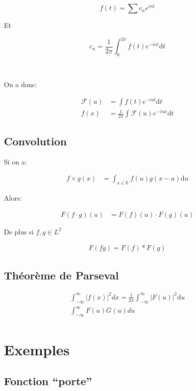 \documentclass[a4paper,11pt]{article}
\begin{document}
$$ f(t) = \sum c_n e^{int}$$

Et

$$ c_n = \frac{1}{2 \pi} \int^{2x}_0 f(t) e ^{-int} \mathrm{d} t $$

\

On a donc:

\begin{align*}
\mathcal{F}(u) &= \int f(t) e^{-iut} \mathrm{d} t \\
  f(x) &= \frac{1}{2 \pi} \int \mathcal{F}(u) e^{-iux} \mathrm{d} t
\end{align*}
\subsection{Convolution}

Si on a:

\begin{align*}
  f \times g(x) &= \int_{x \in \mathbb{R}} f(u) g(x - a) \mathrm{d}u
\end{align*}

Alors:

\begin{align*}
  F(f \cdot g) (u) &= F(f)(u) \cdot F(g)(u)
\end{align*}

De plus si $f,g \in L^2$

\begin{align*}
  F(fg) = F(f) * F(g)
\end{align*}

\subsection{Théorème de Parseval}

\begin{align*}
  \int_{-\infty}^{\infty} |f(x)|^2 dx = \frac{1}{2\pi} \int_{-\infty}^{\infty} |F(u)|^2 \mathrm{d}u\\
  \int_{-\infty}^{\infty} F(u)\overline{G}(u) du\\ %
\end{align*}

\section{Exemples}

\subsection{Fonction ``porte''}
\end{document}
